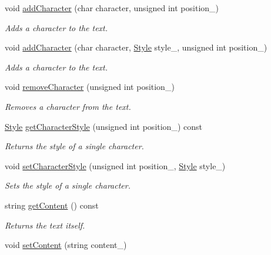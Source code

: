 \begin{CompactItemize}
void \hyperlink{class_text_52cb58f78952984e3d24cd80a0569219}{addCharacter} (char character, unsigned int position\_\-)
\begin{CompactList}\small\item\em Adds a character to the text. \item\end{CompactList}\item 
void \hyperlink{class_text_254e6cce10d3ed94b8a5969c6d21af57}{addCharacter} (char character, \hyperlink{class_style}{Style} style\_\-, unsigned int position\_\-)
\begin{CompactList}\small\item\em Adds a character to the text. \item\end{CompactList}\item 
void \hyperlink{class_text_8f38ee63a6b7706d5822ee98ac6413bc}{removeCharacter} (unsigned int position\_\-)
\begin{CompactList}\small\item\em Removes a character from the text. \item\end{CompactList}\item 
\hyperlink{class_style}{Style} \hyperlink{class_text_e7f5d4bb80673566a91e53f70fdfcaa2}{getCharacterStyle} (unsigned int position\_\-) const 
\begin{CompactList}\small\item\em Returns the style of a single character. \item\end{CompactList}\item 
void \hyperlink{class_text_675870393c37aea8ea2018bc318620f3}{setCharacterStyle} (unsigned int position\_\-, \hyperlink{class_style}{Style} style\_\-)
\begin{CompactList}\small\item\em Sets the style of a single character. \item\end{CompactList}\item 
string \hyperlink{class_text_b982578fcb4eda8f6cb49927600f859f}{getContent} () const 
\begin{CompactList}\small\item\em Returns the text itself. \item\end{CompactList}\item 
void \hyperlink{class_text_c96c194afc22e2d11cbc547cde66fe3b}{setContent} (string content\_\-)

\end{CompactItemize}

